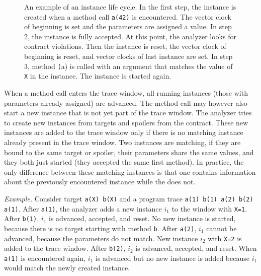 \begin{figure}[hbt]
    \begin{center}
        \label{instanceLifeCycle}
        
        
        
        
        \caption{An example of an instance life cycle. In the first step, the
        instance is created when a method call \texttt{a(42)} is encountered.
        The vector clock of beginning is set and the parameters are assigned a
        value. In step 2, the instance is fully accepted. At this point, the
        analyzer looks for contract violations. Then the instance is reset, the
        vector clock of beginning is reset, and vector clocks of last instance
        are set. In step 3, method \texttt(a) is called with an argument that
        matches the value of \texttt{X} in the instance. The instance is started
        again. }
    \end{center}
\end{figure}

When a method call enters the trace window, all running instances (those with
parameters already assigned) are advanced. The method call may however also
start a new instance that is not yet part of the trace window. The analyzer
tries to create new instances from targets and spoilers from the contract. These
new instances are added to the trace window only if there is no matching
instance already present in the trace window. Two instances are matching, if
they are bound to the same target or spoiler, their parameters share the same
values, and they both just started (they accepted the same first method). In
practice, the only difference between these matching instances is that one
contains information about the previously encountered instance while the does
not.

\emph{Example.} Consider target \texttt{a(X) b(X)} and a program trace
\texttt{a(1) b(1) a(2) b(2) a(1)}. After \texttt{a(1)}, the analyzer adds a new
instance $i_1$ to the window with \texttt{X=1}. After \texttt{b(1)}, $i_1$ is
advanced, accepted, and reset. No new instance is started, because there is no
target starting with method \texttt{b}. After \texttt{a(2)}, $i_1$ cannot be
advanced, because the parameters do not match. New instance $i_2$ with
\texttt{X=2} is added to the trace window. After \texttt{b(2)}, $i_2$ is
advanced, accepted, and reset.  When \texttt{a(1)} is encountered again, $i_1$
is advanced but no new instance is added because $i_1$ would match the newly
created instance.

